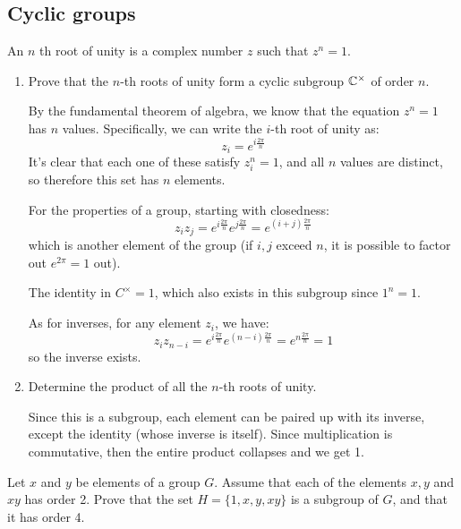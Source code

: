 \documentclass[10pt]{article}
\begin{document}
\subsection{Cyclic groups}
\begin{problem}
	An \( n \) th root of unity is a complex number \( z \) such that \( z^{n} = 1 \). 
	\begin{enumerate}[label=\alph*)]
		\item Prove that the \( n \)-th roots of unity form a cyclic subgroup 
			\( \mathbb C^{\times} \) of order \( n \). 

			\begin{solution}
				By the fundamental theorem of algebra, we know that 
				the equation \( z^{n} = 1 \) has \( n \) values. Specifically, 
				we can write the \( i \)-th root of unity as:
				\[
				z_i = e^{i\frac{2\pi}{n}}
				\] 
				It's clear that each one of these satisfy \( z_i^{n} = 1 \), and all 
				\( n \) values are distinct, so therefore this set has \( n \) 
				elements.  

				For the properties of a group, starting with closedness:
				\[
				z_iz_j = e^{i \frac{2\pi}{n}} e^{j \frac{2\pi}{n}} 
				= e^{(i + j) \frac{2\pi}{n}}
				\] 
				which is another element of the group (if \( i, j \) exceed \( n \), 
				it is possible to factor out \( e^{2 \pi} = 1\) out). 

				The identity in \( C^{\times} = 1 \), which also exists 
				in this subgroup since \( 1^{n} = 1 \). 

				As for inverses, for any element \( z_i \), we have:
				\[
				z_i z_{n - i} = e^{i \frac{2 \pi}{n}}e^{(n - i) \frac{2 \pi}{n}}
				= e^{n \frac{2 \pi}{n}} = 1
				\] 
				so the inverse exists. 
			\end{solution}
		\item Determine the product of all the \( n \)-th roots of unity. 

			\begin{solution}
				Since this is a subgroup, each element can be paired up with its 
				inverse, except the identity (whose inverse is itself). Since 
				multiplication is commutative, then the entire product collapses
				and we get 1. 
			\end{solution}
	\end{enumerate}
\end{problem}

\begin{problem}
	Let \( x \) and \( y \) be elements of a group \( G \). Assume that each of the 
	elements \( x, y \) and \( xy \) has order 2. Prove that the set 
	\( H = \{1, x, y, xy\}  \) is a subgroup of \( G \), and that it 
	has order 4.
\end{problem}
\end{document}

